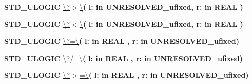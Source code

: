 \begin{DoxyCompactItemize}
\item 
{\bfseries {\bfseries \textcolor{comment}{S\+T\+D\+\_\+\+U\+L\+O\+G\+I\+C}\textcolor{vhdlchar}{ }}} \hyperlink{classfixed__pkg_a9e6b6b8c2c14da978e6f70cb6e85e6dc}{\textbackslash{}?$>$\textbackslash{}}{\bfseries  ( }{\bfseries \textcolor{vhdlchar}{l\+: }\textcolor{stringliteral}{in }\textcolor{vhdlchar}{U\+N\+R\+E\+S\+O\+L\+V\+E\+D\+\_\+ufixed}}{\bfseries  , \textcolor{vhdlchar}{r\+: }\textcolor{stringliteral}{in }{\bfseries \textcolor{comment}{R\+E\+A\+L}\textcolor{vhdlchar}{ }}}{\bfseries  )} 
\item 
{\bfseries {\bfseries \textcolor{comment}{S\+T\+D\+\_\+\+U\+L\+O\+G\+I\+C}\textcolor{vhdlchar}{ }}} \hyperlink{classfixed__pkg_a7e98e66a4a282c529968f69f70dd16ad}{\textbackslash{}?$<$\textbackslash{}}{\bfseries  ( }{\bfseries \textcolor{vhdlchar}{l\+: }\textcolor{stringliteral}{in }\textcolor{vhdlchar}{U\+N\+R\+E\+S\+O\+L\+V\+E\+D\+\_\+ufixed}}{\bfseries  , \textcolor{vhdlchar}{r\+: }\textcolor{stringliteral}{in }{\bfseries \textcolor{comment}{R\+E\+A\+L}\textcolor{vhdlchar}{ }}}{\bfseries  )} 
\item 
{\bfseries {\bfseries \textcolor{comment}{S\+T\+D\+\_\+\+U\+L\+O\+G\+I\+C}\textcolor{vhdlchar}{ }}} \hyperlink{classfixed__pkg_a69151531d87456d952c2073704fa1779}{\textbackslash{}?=\textbackslash{}}{\bfseries  ( }{\bfseries \textcolor{vhdlchar}{l\+: }\textcolor{stringliteral}{in }{\bfseries \textcolor{comment}{R\+E\+A\+L}\textcolor{vhdlchar}{ }}}{\bfseries  , \textcolor{vhdlchar}{r\+: }\textcolor{stringliteral}{in }\textcolor{vhdlchar}{U\+N\+R\+E\+S\+O\+L\+V\+E\+D\+\_\+ufixed}}{\bfseries  )} 
\item 
{\bfseries {\bfseries \textcolor{comment}{S\+T\+D\+\_\+\+U\+L\+O\+G\+I\+C}\textcolor{vhdlchar}{ }}} \hyperlink{classfixed__pkg_a172a73302b09f0d298b93ecda8c5e976}{\textbackslash{}?/=\textbackslash{}}{\bfseries  ( }{\bfseries \textcolor{vhdlchar}{l\+: }\textcolor{stringliteral}{in }{\bfseries \textcolor{comment}{R\+E\+A\+L}\textcolor{vhdlchar}{ }}}{\bfseries  , \textcolor{vhdlchar}{r\+: }\textcolor{stringliteral}{in }\textcolor{vhdlchar}{U\+N\+R\+E\+S\+O\+L\+V\+E\+D\+\_\+ufixed}}{\bfseries  )} 
\item 
{\bfseries {\bfseries \textcolor{comment}{S\+T\+D\+\_\+\+U\+L\+O\+G\+I\+C}\textcolor{vhdlchar}{ }}} \hyperlink{classfixed__pkg_a3adee8c12e5c0bb76fc3e1a493284a27}{\textbackslash{}?$>$=\textbackslash{}}{\bfseries  ( }{\bfseries \textcolor{vhdlchar}{l\+: }\textcolor{stringliteral}{in }{\bfseries \textcolor{comment}{R\+E\+A\+L}\textcolor{vhdlchar}{ }}}{\bfseries  , \textcolor{vhdlchar}{r\+: }\textcolor{stringliteral}{in }\textcolor{vhdlchar}{U\+N\+R\+E\+S\+O\+L\+V\+E\+D\+\_\+ufixed}}{\bfseries  )} 

\end{DoxyCompactItemize}

